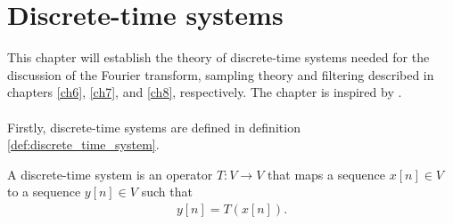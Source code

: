 \chapter{Discrete-time systems}\label{discrete_time_systems} \label{ch4}
This chapter will establish the theory of discrete-time systems needed for the discussion of the Fourier transform, sampling theory and filtering described in chapters \ref{ch6}, \ref{ch7}, and \ref{ch8}, respectively. The chapter is inspired by \cite{page 195-198, FSP}.
\\ \\
Firstly, discrete-time systems are defined in definition \ref{def:discrete_time_system}.

\begin{definition}\label{def:discrete_time_system}
A discrete-time system is an operator $T: V \to V$ that maps a sequence $x[n]\in V$ to a sequence $y[n]\in V$ such that
\begin{align}\label{eq:DTS}
y[n]=T(x[n]).
\end{align}
\end{definition}

